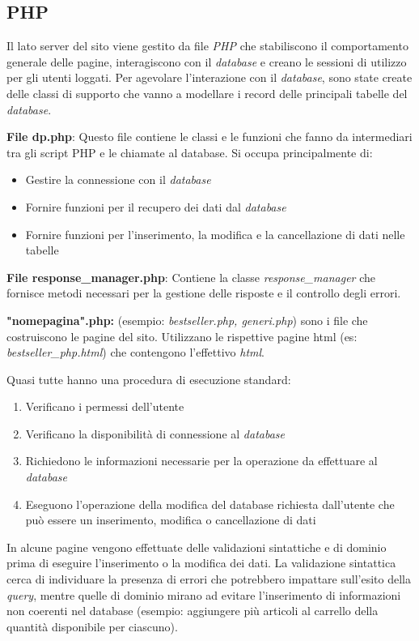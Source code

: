 \subsection{PHP}
Il lato server del sito viene gestito da file \textit{PHP} che stabiliscono il comportamento generale delle pagine, interagiscono con il \textit{database} e creano le sessioni di utilizzo per gli utenti loggati. Per agevolare l’interazione con il \textit{database}, sono state create delle classi di supporto che vanno a modellare i record delle principali tabelle del \textit{database}.

\textbf{File dp.php}: Questo file contiene le classi e le funzioni che fanno da intermediari tra gli script PHP e le chiamate al database. Si occupa principalmente di:
	\begin{itemize}
		\item Gestire la connessione con il \textit{database}
		\item Fornire funzioni per il recupero dei dati dal \textit{database}
		\item Fornire funzioni per l’inserimento, la modifica e la cancellazione di dati nelle tabelle
	\end{itemize}
	
\textbf{File response\_manager.php}: Contiene la classe \textit{response\_manager} che fornisce metodi necessari per la gestione delle risposte e il controllo degli errori.

\textbf{"nomepagina".php:} (esempio: \textit{bestseller.php, generi.php}) sono i file che costruiscono le pagine del sito. Utilizzano le rispettive pagine html (es: \textit{bestseller\_php.html}) che contengono l’effettivo \textit{html}.

Quasi tutte hanno una procedura di esecuzione standard:
\begin{enumerate}
	\item Verificano i permessi dell’utente
	\item Verificano la disponibilità di connessione al \textit{database}
	\item Richiedono le informazioni necessarie per la operazione da effettuare al \textit{database}
	\item Eseguono l'operazione della modifica del database richiesta dall’utente che può essere un inserimento, modifica o cancellazione di dati
\end{enumerate}

In alcune pagine vengono effettuate delle validazioni sintattiche e di dominio prima di eseguire l’inserimento o la modifica dei dati. La validazione sintattica cerca di individuare la presenza di errori che potrebbero impattare sull'esito della \textit{query}, mentre quelle di dominio mirano ad evitare l’inserimento di informazioni non coerenti nel database (esempio: aggiungere più articoli al carrello della quantità disponibile per ciascuno).

